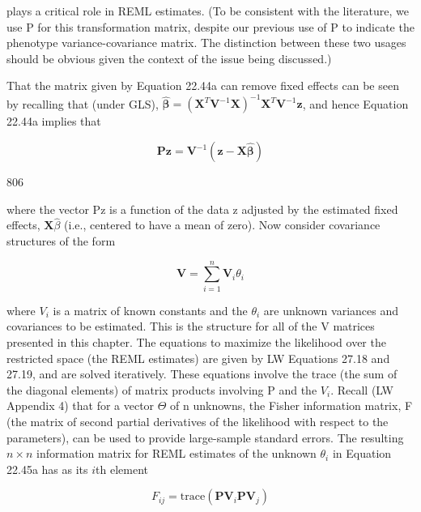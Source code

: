 \documentclass{article}
\begin{document}
plays a critical role in REML estimates. (To be consistent with the literature, we use P for this transformation matrix, despite our previous use of P to indicate the phenotype variance-covariance matrix. The distinction between these two usages should be obvious given the context of the issue being discussed.)

That the matrix given by Equation 22.44a can remove fixed effects can be seen by recalling that (under GLS),  $ \widehat{\boldsymbol{\beta}} = (\mathbf{X}^{T}\mathbf{V}^{-1}\mathbf{X})^{-1}\mathbf{X}^{T}\mathbf{V}^{-1}\mathbf{z} $, and hence Equation 22.44a implies that

\begin{equation}
\mathbf{P}\mathbf{z}=\mathbf{V}^{-1}\left(\mathbf{z}-\mathbf{X}\widehat{\boldsymbol{\beta}}\right)
\tag{22.44b}
\label{eq:22_44b}
\end{equation}

806

where the vector Pz is a function of the data z adjusted by the estimated fixed effects,  $ \mathbf{X}\hat{\beta} $ (i.e., centered to have a mean of zero). Now consider covariance structures of the form

\begin{equation}
\mathbf{V}=\sum_{i=1}^{n}\mathbf{V}_{i}\theta_{i}
\tag{22.45a}
\label{eq:22_45a}
\end{equation}

where  $ V_i $ is a matrix of known constants and the  $ \theta_i $ are unknown variances and covariances to be estimated. This is the structure for all of the V matrices presented in this chapter. The equations to maximize the likelihood over the restricted space (the REML estimates) are given by LW Equations 27.18 and 27.19, and are solved iteratively. These equations involve the trace (the sum of the diagonal elements) of matrix products involving P and the  $ V_i $. Recall (LW Appendix 4) that for a vector  $ \Theta $ of n unknowns, the Fisher information matrix, F (the matrix of second partial derivatives of the likelihood with respect to the parameters), can be used to provide large-sample standard errors. The resulting  $ n \times n $ information matrix for REML estimates of the unknown  $ \theta_i $ in Equation 22.45a has as its  $ i $th element

\begin{equation}
F_{ij}=\mathrm{trace}\left(\mathbf{P}\mathbf{V}_{i}\mathbf{P}\mathbf{V}_{j}\right)
\tag{22.45b}
\label{eq:22_45b}
\end{equation}
\end{document}
